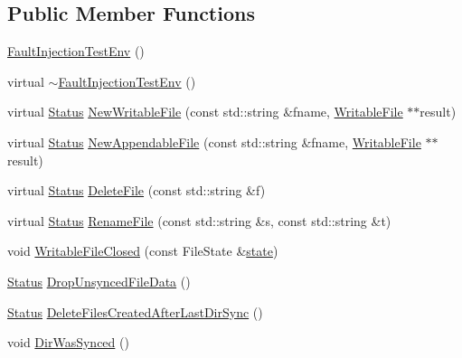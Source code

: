\subsection*{Public Member Functions}
\begin{DoxyCompactItemize}
\item 
\mbox{\hyperlink{classleveldb_1_1_fault_injection_test_env_ac997cc4e898833449565bfcd1ff419ba}{Fault\+Injection\+Test\+Env}} ()
\item 
virtual \mbox{\hyperlink{classleveldb_1_1_fault_injection_test_env_aacf6c0672dc27bced909f7b638fc5269}{$\sim$\+Fault\+Injection\+Test\+Env}} ()
\item 
virtual \mbox{\hyperlink{classleveldb_1_1_status}{Status}} \mbox{\hyperlink{classleveldb_1_1_fault_injection_test_env_a1e89cf48116748a2f7d8c07022eab4f7}{New\+Writable\+File}} (const std\+::string \&fname, \mbox{\hyperlink{classleveldb_1_1_writable_file}{Writable\+File}} $\ast$$\ast$result)
\item 
virtual \mbox{\hyperlink{classleveldb_1_1_status}{Status}} \mbox{\hyperlink{classleveldb_1_1_fault_injection_test_env_ab3147789bfa49d4a50a06e7c2a1628ef}{New\+Appendable\+File}} (const std\+::string \&fname, \mbox{\hyperlink{classleveldb_1_1_writable_file}{Writable\+File}} $\ast$$\ast$result)
\item 
virtual \mbox{\hyperlink{classleveldb_1_1_status}{Status}} \mbox{\hyperlink{classleveldb_1_1_fault_injection_test_env_a3da37455396b1b0cd66689bf5302ebd9}{Delete\+File}} (const std\+::string \&f)
\item 
virtual \mbox{\hyperlink{classleveldb_1_1_status}{Status}} \mbox{\hyperlink{classleveldb_1_1_fault_injection_test_env_ac283e671532ee024cf22f84b95680061}{Rename\+File}} (const std\+::string \&s, const std\+::string \&t)
\item 
void \mbox{\hyperlink{classleveldb_1_1_fault_injection_test_env_accd10539b6cfa51468fe9cd6b85fd655}{Writable\+File\+Closed}} (const File\+State \&\mbox{\hyperlink{version__set_8cc_a6aad002d0db5e5e85dc31927a5a6f503}{state}})
\item 
\mbox{\hyperlink{classleveldb_1_1_status}{Status}} \mbox{\hyperlink{classleveldb_1_1_fault_injection_test_env_a4201d9bce4e169d3a5320c3ecbf05490}{Drop\+Unsynced\+File\+Data}} ()
\item 
\mbox{\hyperlink{classleveldb_1_1_status}{Status}} \mbox{\hyperlink{classleveldb_1_1_fault_injection_test_env_a0356c344573232057e7afcd738079805}{Delete\+Files\+Created\+After\+Last\+Dir\+Sync}} ()
\item 
void \mbox{\hyperlink{classleveldb_1_1_fault_injection_test_env_a81cf3925b249591f4247757538005dfc}{Dir\+Was\+Synced}} ()

\end{DoxyCompactItemize}
